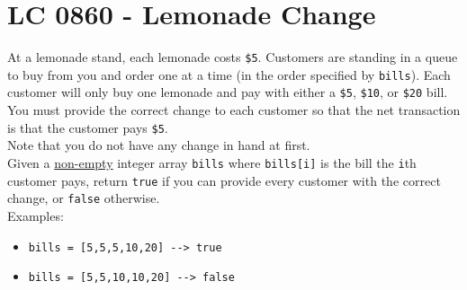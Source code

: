 \section{LC 0860 - Lemonade Change}
At a lemonade stand, each lemonade costs {\colorbox{CodeBackground}{\lstinline|$5|}}. Customers are standing in a queue to buy from you and order one at a time (in the order specified by {\colorbox{CodeBackground}{\lstinline|bills|}}). Each customer will only buy one lemonade and pay with either a {\colorbox{CodeBackground}{\lstinline|$5|}}, {\colorbox{CodeBackground}{\lstinline|$10|}}, or {\colorbox{CodeBackground}{\lstinline|$20|}} bill. You must provide the correct change to each customer so that the net transaction is that the customer pays {\colorbox{CodeBackground}{\lstinline|$5|}}.\\

Note that you do not have any change in hand at first.\\

Given a \ul{non-empty} integer array {\colorbox{CodeBackground}{\lstinline|bills|}} where {\colorbox{CodeBackground}{\lstinline|bills[i]|}} is the bill the {\colorbox{CodeBackground}{\lstinline|i|}}th customer pays, return {\colorbox{CodeBackground}{\lstinline|true|}} if you can provide every customer with the correct change, or {\colorbox{CodeBackground}{\lstinline|false|}} otherwise.\\

Examples:
\begin{itemize}
	\item {\colorbox{CodeBackground}{\lstinline|bills = [5,5,5,10,20] --> true|}}
	\item {\colorbox{CodeBackground}{\lstinline|bills = [5,5,10,10,20] --> false|}}
\end{itemize}

